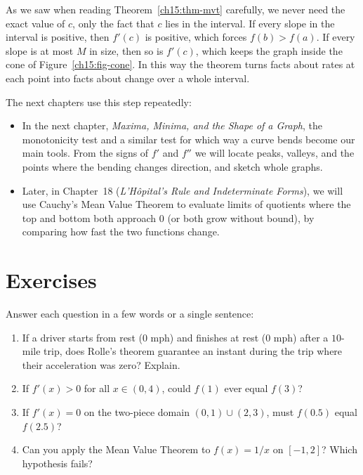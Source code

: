 \begin{connectionbox}
As we saw when reading Theorem~\ref{ch15:thm-mvt} carefully, we never need the exact
value of $c$, only
the fact that $c$ lies in the interval. If every slope in the interval is positive, then
$f'(c)$ is positive, which forces $f(b)>f(a)$. If every slope is at most $M$ in size,
then so is $f'(c)$, which keeps the graph inside the cone of
Figure~\ref{ch15:fig-cone}. In this way the theorem turns facts about rates at each
point into facts about change over a whole interval.

The next chapters use this step repeatedly:
\begin{itemize}
  \item In the next chapter, \emph{Maxima, Minima, and the Shape of a Graph}, the
  monotonicity test and a similar test for which way a curve bends become our main
  tools. From the signs of $f'$ and $f''$ we will locate peaks, valleys, and the
  points where the bending changes direction, and sketch whole graphs.
  \item Later, in Chapter~18 (\emph{L'H\^opital's Rule and Indeterminate Forms}), we
  will use Cauchy's Mean Value Theorem to evaluate limits of quotients where the top
  and bottom both approach $0$ (or both grow without bound), by comparing how fast the
  two functions change.
\end{itemize}
\end{connectionbox}

\section{Exercises}

\begin{exercise}
Answer each question in a few words or a single sentence:
\begin{enumerate}[label=(\alph*)]
\item If a driver starts from rest ($0$ mph) and finishes at rest ($0$ mph) after a
$10$-mile trip, does Rolle's theorem guarantee an instant during the trip where their
acceleration was zero? Explain.
\item If $f'(x) > 0$ for all $x\in(0, 4)$, could $f(1)$ ever equal $f(3)$?
\item If $f'(x) = 0$ on the two-piece domain $(0, 1) \cup (2, 3)$, must $f(0.5)$
equal $f(2.5)$?
\item Can you apply the Mean Value Theorem to $f(x) = 1/x$ on $[-1, 2]$? Which
hypothesis fails?
\end{enumerate}
\end{exercise}

